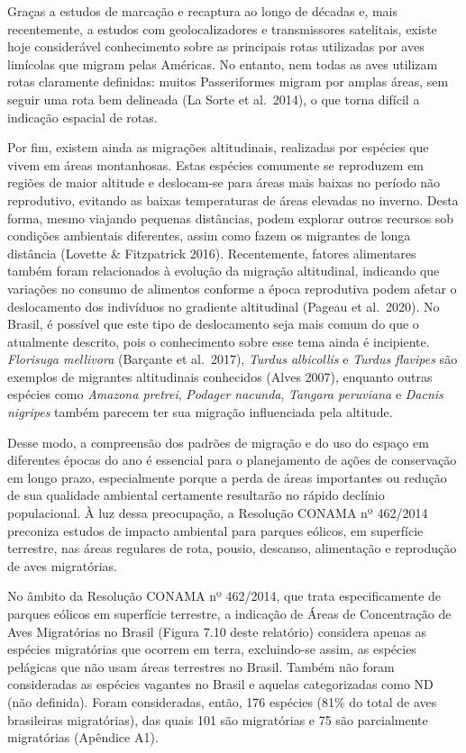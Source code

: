 \documentclass[
  oneside]{scrbook}
\begin{document}
Graças a estudos de marcação e recaptura ao longo de décadas e, mais recentemente, a estudos com geolocalizadores e transmissores satelitais, existe hoje considerável conhecimento sobre as principais rotas utilizadas por aves limícolas que migram pelas Américas. No entanto, nem todas as aves utilizam rotas claramente definidas: muitos Passeriformes migram por amplas áreas, sem seguir uma rota bem delineada (La Sorte et al.~2014), o que torna difícil a indicação espacial de rotas.

Por fim, existem ainda as migrações altitudinais, realizadas por espécies que vivem em áreas montanhosas. Estas espécies comumente se reproduzem em regiões de maior altitude e deslocam-se para áreas mais baixas no período não reprodutivo, evitando as baixas temperaturas de áreas elevadas no inverno. Desta forma, mesmo viajando pequenas distâncias, podem explorar outros recursos sob condições ambientais diferentes, assim como fazem os migrantes de longa distância (Lovette \& Fitzpatrick 2016). Recentemente, fatores alimentares também foram relacionados à evolução da migração altitudinal, indicando que variações no consumo de alimentos conforme a época reprodutiva podem afetar o deslocamento dos indivíduos no gradiente altitudinal (Pageau et al.~2020). No Brasil, é possível que este tipo de deslocamento seja mais comum do que o atualmente descrito, pois o conhecimento sobre esse tema ainda é incipiente. \emph{Florisuga mellivora} (Barçante et al.~2017), \emph{Turdus albicollis} e \emph{Turdus flavipes} são exemplos de migrantes altitudinais conhecidos (Alves 2007), enquanto outras espécies como \emph{Amazona pretrei}, \emph{Podager nacunda}, \emph{Tangara peruviana} e \emph{Dacnis nigripes} também parecem ter sua migração influenciada pela altitude.

Desse modo, a compreensão dos padrões de migração e do uso do espaço em diferentes épocas do ano é essencial para o planejamento de ações de conservação em longo prazo, especialmente porque a perda de áreas importantes ou redução de sua qualidade ambiental certamente resultarão no rápido declínio populacional. À luz dessa preocupação, a Resolução CONAMA nº 462/2014 preconiza estudos de impacto ambiental para parques eólicos, em superfície terrestre, nas áreas regulares de rota, pousio, descanso, alimentação e reprodução de aves migratórias.

No âmbito da Resolução CONAMA nº 462/2014, que trata especificamente de parques eólicos em superfície terrestre, a indicação de Áreas de Concentração de Aves Migratórias no Brasil (Figura 7.10 deste relatório) considera apenas as espécies migratórias que ocorrem em terra, excluindo-se assim, as espécies pelágicas que não usam áreas terrestres no Brasil. Também não foram consideradas as espécies vagantes no Brasil e aquelas categorizadas como ND (não definida). Foram consideradas, então, 176 espécies (81\% do total de aves brasileiras migratórias), das quais 101 são migratórias e 75 são parcialmente migratórias (Apêndice A1).
\end{document}
